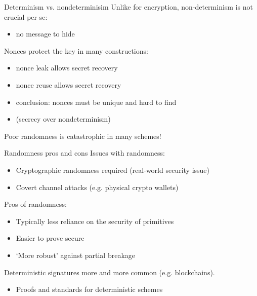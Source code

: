 \begin{frame}{Determinism vs. nondeterminisim}
  \pause
  Unlike for encryption, non-determinism is not crucial per se:
  \begin{itemize}[<+(1)->]
    \item no message to hide
  \end{itemize}

  \pause
  Nonces protect the key in many constructions:
  \begin{itemize}[<+(1)->]
    \item nonce leak allows secret recovery
    \item nonce reuse allows secret recovery
    \item conclusion: nonces must be unique and hard to find
    \item (secrecy over nondeterminism)
  \end{itemize}

  \pause
  Poor randomness is catastrophic in many schemes!
\end{frame}

\begin{frame}{Randomness pros and cons}
  \pause
  Issues with randomness:
  \begin{itemize}[<+(1)->]
    \item Cryptographic randomness required (real-world security issue)
    \item Covert channel attacks (e.g. physical crypto wallets)
  \end{itemize}

  \pause
  Pros of randomness:
  \begin{itemize}[<+(1)->]
    \item Typically less reliance on the security of primitives
    \item Easier to prove secure
    \item `More robust' against partial breakage
  \end{itemize}

  \pause
  Deterministic signatures more and more common (e.g. blockchains).
  \begin{itemize}[<+(1)->]
    \item Proofs and standards for deterministic schemes
  \end{itemize}
\end{frame}

